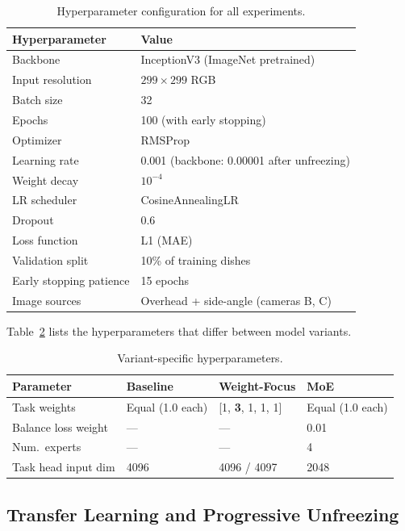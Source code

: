 \documentclass[11pt,a4paper]{article}
\begin{document}
\begin{table}[H]
\centering
\caption{Hyperparameter configuration for all experiments.}
\label{tab:hyperparams}
\begin{tabular}{@{}ll@{}}
\toprule
\textbf{Hyperparameter} & \textbf{Value} \\
\midrule
Backbone & InceptionV3 (ImageNet pretrained) \\
Input resolution & $299 \times 299$ RGB \\
Batch size & 32 \\
Epochs & 100 (with early stopping) \\
Optimizer & RMSProp \\
Learning rate & 0.001 (backbone: 0.00001 after unfreezing) \\
Weight decay & $10^{-4}$ \\
LR scheduler & CosineAnnealingLR \\
Dropout & 0.6 \\
Loss function & L1 (MAE) \\
Validation split & 10\% of training dishes \\
Early stopping patience & 15 epochs \\
Image sources & Overhead + side-angle (cameras B, C) \\
\bottomrule
\end{tabular}
\end{table}

Table~\ref{tab:variant_hyperparams} lists the hyperparameters that differ between model variants.

\begin{table}[H]
\centering
\caption{Variant-specific hyperparameters.}
\label{tab:variant_hyperparams}
\begin{tabular}{@{}llll@{}}
\toprule
\textbf{Parameter} & \textbf{Baseline} & \textbf{Weight-Focus} & \textbf{MoE} \\
\midrule
Task weights & Equal (1.0 each) & [1, \textbf{3}, 1, 1, 1] & Equal (1.0 each) \\
Balance loss weight & --- & --- & 0.01 \\
Num.\ experts & --- & --- & 4 \\
Task head input dim & 4096 & 4096 / 4097 & 2048 \\
\bottomrule
\end{tabular}
\end{table}

\subsection{Transfer Learning and Progressive Unfreezing}
\end{document}
